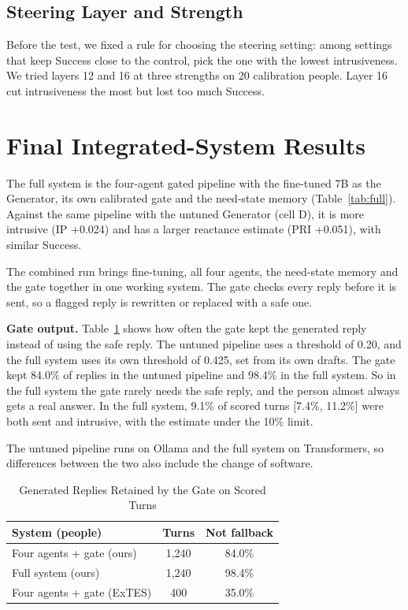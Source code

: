 \documentclass[journal]{IEEEtran}
\newcommand{\tsize}{\footnotesize}
\begin{document}
\subsection{Steering Layer and Strength}
Before the test, we fixed a rule for choosing the steering setting: among settings that keep Success close to the control, pick the one with the lowest intrusiveness. We tried layers 12 and 16 at three strengths on 20 calibration people. Layer 16 cut intrusiveness the most but lost too much Success.

\section{Final Integrated-System Results}\label{sec:r-full}
The full system is the four-agent gated pipeline with the fine-tuned 7B as the Generator, its own calibrated gate and the need-state memory (Table~\ref{tab:full}). Against the same pipeline with the untuned Generator (cell D), it is more intrusive (IP +0.024) and has a larger reactance estimate (PRI +0.051), with similar Success.

The combined run brings fine-tuning, all four agents, the need-state memory and the gate together in one working system. The gate checks every reply before it is sent, so a flagged reply is rewritten or replaced with a safe one.

\textbf{Gate output.} Table~\ref{tab:viols} shows how often the gate kept the generated reply instead of using the safe reply. The untuned pipeline uses a threshold of 0.20, and the full system uses its own threshold of 0.425, set from its own drafts. The gate kept 84.0\% of replies in the untuned pipeline and 98.4\% in the full system. So in the full system the gate rarely needs the safe reply, and the person almost always gets a real answer. In the full system, 9.1\% of scored turns [7.4\%, 11.2\%] were both sent and intrusive, with the estimate under the 10\% limit.

The untuned pipeline runs on Ollama and the full system on Transformers, so differences between the two also include the change of software.

\begin{table}[!htb]
\caption{Generated Replies Retained by the Gate on Scored Turns}
\label{tab:viols}
\centering\tsize\setlength{\tabcolsep}{5.4pt}
\begin{tabular}{@{}lcc@{}}
\toprule
System (people) & Turns & Not fallback\\
\midrule
Four agents + gate (ours) & 1,240 & 84.0\%\\
Full system (ours) & 1,240 & 98.4\%\\
Four agents + gate (ExTES) & 400 & 35.0\%\\
\bottomrule
\end{tabular}
\end{table}
\end{document}
